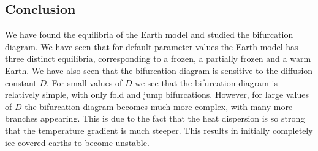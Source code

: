 \subsection{Conclusion}
    We have found the equilibria of the Earth model and studied the bifurcation diagram. We have seen that for default parameter values the Earth model has three distinct equilibria, 
    corresponding to a frozen, a partially frozen and a warm Earth. We have also seen that the bifurcation diagram is sensitive to the 
    diffusion constant $D$. For small values of $D$ we see that the bifurcation diagram is relatively simple, with only fold and jump bifurcations. However, for 
    large values of $D$ the bifurcation diagram becomes much more complex, with many more branches appearing. This is due to the fact that the heat dispersion is so 
    strong that the temperature gradient is much steeper. This results in initially completely ice covered earths to become unstable.